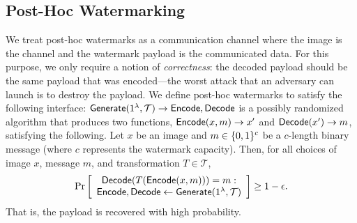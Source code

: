\documentclass[12pt]{article}
\begin{document}
\subsection{Post-Hoc Watermarking} 
We treat post-hoc watermarks as a communication channel where the image is the channel and the watermark payload is the communicated data.
For this purpose, we only require a notion of \textit{correctness}: the decoded payload should be the same payload that was encoded---the worst attack that an adversary can launch is to destroy the payload.
We define post-hoc watermarks to satisfy the following interface: $\mathsf{Generate}(1^\lambda, \mathcal{T}) \to \mathsf{Encode}, \mathsf{Decode}$ is a possibly randomized algorithm that produces two functions, $\mathsf{Encode}(x, m) \to x'$ and $\mathsf{Decode}(x') \to m$, satisfying the following.
Let $x$ be an image and $m \in \{0,1\}^c$ be a $c$-length binary message (where $c$ represents the watermark capacity).
Then, for all choices of image $x$, message $m$, and transformation $T \in \mathcal{T}$,
\begin{align*}
    \Pr\left[
    \begin{array}{ccc}
        \begin{matrix}
            \mathsf{Decode}(T(\mathsf{Encode}(x, m))) = m: \\
            \mathsf{Encode}, \mathsf{Decode} \gets \mathsf{Generate}(1^\lambda, \mathcal{T}) \\
        \end{matrix} \\
    \end{array}
    \right] \geq 1 - \epsilon.
\end{align*}
That is, the payload is recovered with high probability.
\end{document}
